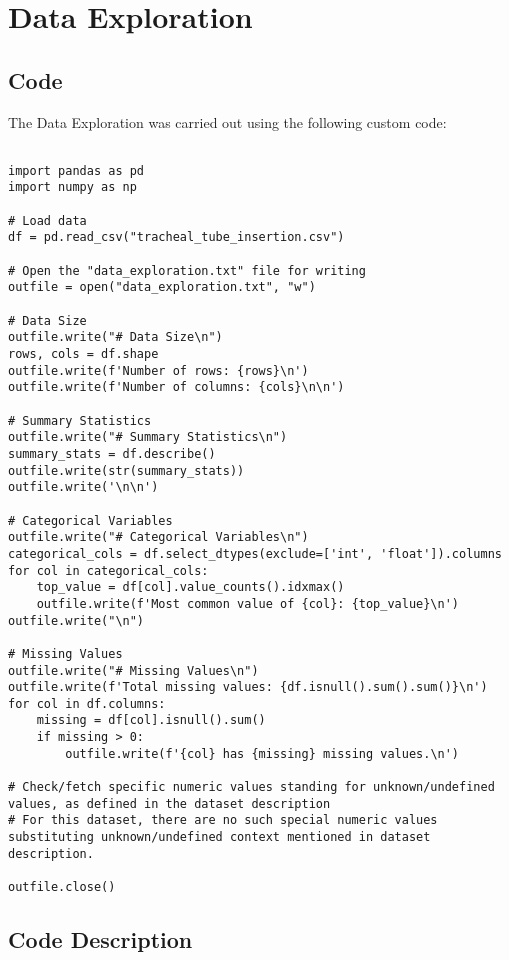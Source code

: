 \documentclass[11pt]{article}
\begin{document}
\section{Data Exploration}
\subsection{{Code}}
The Data Exploration was carried out using the following custom code:

\begin{verbatim}

import pandas as pd
import numpy as np

# Load data
df = pd.read_csv("tracheal_tube_insertion.csv")

# Open the "data_exploration.txt" file for writing
outfile = open("data_exploration.txt", "w")

# Data Size
outfile.write("# Data Size\n")
rows, cols = df.shape
outfile.write(f'Number of rows: {rows}\n')
outfile.write(f'Number of columns: {cols}\n\n')

# Summary Statistics
outfile.write("# Summary Statistics\n")
summary_stats = df.describe()
outfile.write(str(summary_stats))
outfile.write('\n\n')

# Categorical Variables
outfile.write("# Categorical Variables\n")
categorical_cols = df.select_dtypes(exclude=['int', 'float']).columns
for col in categorical_cols:
    top_value = df[col].value_counts().idxmax()
    outfile.write(f'Most common value of {col}: {top_value}\n')
outfile.write("\n")

# Missing Values
outfile.write("# Missing Values\n")
outfile.write(f'Total missing values: {df.isnull().sum().sum()}\n')
for col in df.columns:
    missing = df[col].isnull().sum()
    if missing > 0:
        outfile.write(f'{col} has {missing} missing values.\n')

# Check/fetch specific numeric values standing for unknown/undefined values, as defined in the dataset description
# For this dataset, there are no such special numeric values substituting unknown/undefined context mentioned in dataset description.

outfile.close()

\end{verbatim}

\subsection{Code Description}
\end{document}
